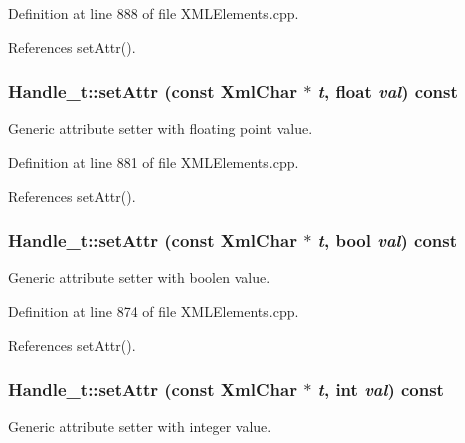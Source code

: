 Definition at line 888 of file XMLElements.cpp.

References setAttr().\hypertarget{class_d_d4hep_1_1_x_m_l_1_1_handle__t_aab5ad5247e83023930ead951d289cf99}{
\subsubsection[{setAttr}]{ Handle\_\-t::setAttr (const {\bf XmlChar} $\ast$ {\em t}, \/  float {\em val}) const}}
\label{class_d_d4hep_1_1_x_m_l_1_1_handle__t_aab5ad5247e83023930ead951d289cf99}


Generic attribute setter with floating point value. 

Definition at line 881 of file XMLElements.cpp.

References setAttr().\hypertarget{class_d_d4hep_1_1_x_m_l_1_1_handle__t_a5126495197f41fe6f88603eb035d4858}{
\subsubsection[{setAttr}]{ Handle\_\-t::setAttr (const {\bf XmlChar} $\ast$ {\em t}, \/  bool {\em val}) const}}
\label{class_d_d4hep_1_1_x_m_l_1_1_handle__t_a5126495197f41fe6f88603eb035d4858}


Generic attribute setter with boolen value. 

Definition at line 874 of file XMLElements.cpp.

References setAttr().\hypertarget{class_d_d4hep_1_1_x_m_l_1_1_handle__t_afa15b5e7b6592b83dffc33106fe1d7d7}{
\subsubsection[{setAttr}]{ Handle\_\-t::setAttr (const {\bf XmlChar} $\ast$ {\em t}, \/  int {\em val}) const}}
\label{class_d_d4hep_1_1_x_m_l_1_1_handle__t_afa15b5e7b6592b83dffc33106fe1d7d7}


Generic attribute setter with integer value. 

